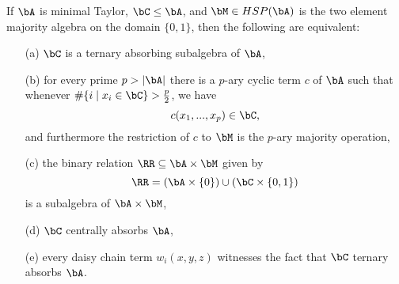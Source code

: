 \begin{thm}\label{thm-minimal-central} If $\bA$ is minimal Taylor, $\bC \le \bA$, and $\bM \in HSP(\bA)$ is the two element majority algebra on the domain $\{0,1\}$, then the following are equivalent:
\begin{itemize}
\item[(a)] $\bC$ is a ternary absorbing subalgebra of $\bA$,
\item[(b)] for every prime $p > |\bA|$ there is a $p$-ary cyclic term $c$ of $\bA$ such that whenever $\#\{i \mid x_i \in \bC\} > \frac{p}{2}$, we have
\[
c(x_1, ..., x_p) \in \bC,
\]
and furthermore the restriction of $c$ to $\bM$ is the $p$-ary majority operation,
\item[(c)] the binary relation $\RR \subseteq \bA \times \bM$ given by
\[
\RR = (\bA \times \{0\}) \cup (\bC \times \{0,1\})
\]
is a subalgebra of $\bA \times \bM$,
\item[(d)] $\bC$ centrally absorbs $\bA$,
\item[(e)] every daisy chain term $w_i(x,y,z)$ witnesses the fact that $\bC$ ternary absorbs $\bA$.
\end{itemize}
\end{thm}
